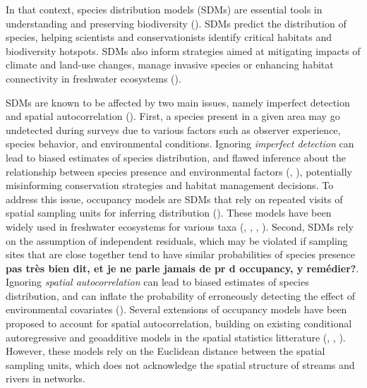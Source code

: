\documentclass[
  11pt,
  a4paper,
]{article}
\begin{document}
In that context, species distribution models (SDMs) are essential tools in understanding and preserving biodiversity (). SDMs predict the distribution of species, helping scientists and conservationists identify critical habitats and biodiversity hotspots. SDMs also inform strategies aimed at mitigating impacts of climate and land-use changes, manage invasive species or enhancing habitat connectivity in freshwater ecosystems ().

SDMs are known to be affected by two main issues, namely imperfect detection and spatial autocorrelation (). First, a species present in a given area may go undetected during surveys due to various factors such as observer experience, species behavior, and environmental conditions. Ignoring \emph{imperfect detection} can lead to biased estimates of species distribution, and flawed inference about the relationship between species presence and environmental factors (, ), potentially misinforming conservation strategies and habitat management decisions. To address this issue, occupancy models are SDMs that rely on repeated visits of spatial sampling units for inferring distribution (). These models have been widely used in freshwater ecosystems for various taxa (, , , ). Second, SDMs rely on the assumption of independent residuals, which may be violated if sampling sites that are close together tend to have similar probabilities of species presence \textbf{pas très bien dit, et je ne parle jamais de pr d occupancy, y remédier?}. Ignoring \emph{spatial autocorrelation} can lead to biased estimates of species distribution, and can inflate the probability of erroneously detecting the effect of environmental covariates (). Several extensions of occupancy models have been proposed to account for spatial autocorrelation, building on existing conditional autoregressive and geoadditive models in the spatial statistics litterature (, , ). However, these models rely on the Euclidean distance between the spatial sampling units, which does not acknowledge the spatial structure of streams and rivers in networks.
\end{document}

